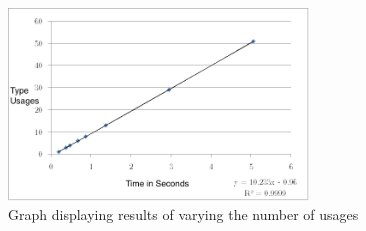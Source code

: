 %

\begin{figure}[h]
\begin{center}

\includegraphics[width=8cm]{scaling}

\caption{Graph displaying results of varying the number of usages}
\label{Fig:comparerefs}
\end{center}
\end{figure}